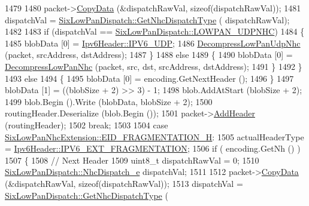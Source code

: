 \begin{DoxyCode}
1479 
1480           packet->\hyperlink{classns3_1_1Packet_a5a6d304b9e0d90733919ffe224b98f0d}{CopyData} (&dispatchRawVal, \textcolor{keyword}{sizeof}(dispatchRawVal));
1481           dispatchVal = \hyperlink{classns3_1_1SixLowPanDispatch_aadc1e9ded2e292f557da546a6a4e49d2}{SixLowPanDispatch::GetNhcDispatchType} (
      dispatchRawVal);
1482 
1483           \textcolor{keywordflow}{if} (dispatchVal == \hyperlink{classns3_1_1SixLowPanDispatch_acbf93399dca3b5424dcc76de45a57f5faf1d4da6a831d704993ea3946327c8c0c}{SixLowPanDispatch::LOWPAN\_UDPNHC})
1484             \{
1485               blobData [0] = \hyperlink{classns3_1_1Ipv6Header_a226429221a066c5e3b1f260caf27d1e9aef42146d6b211521c22f827b04530253}{Ipv6Header::IPV6\_UDP};
1486               \hyperlink{classns3_1_1SixLowPanNetDevice_a0b31fbe0bdc3a4dd59b9f7426aec8ed8}{DecompressLowPanUdpNhc} (packet, srcAddress, dstAddress);
1487             \}
1488           \textcolor{keywordflow}{else}
1489             \{
1490               blobData [0] = \hyperlink{classns3_1_1SixLowPanNetDevice_af69701425fa2e02ab4a7fdcd1db99cc8}{DecompressLowPanNhc} (packet, src, dst, srcAddress, 
      dstAddress);
1491             \}
1492         \}
1493       \textcolor{keywordflow}{else}
1494         \{
1495           blobData [0] = encoding.GetNextHeader ();
1496         \}
1497       blobData [1] = ((blobSize + 2) >> 3) - 1;
1498       blob.AddAtStart (blobSize + 2);
1499       blob.Begin ().Write (blobData, blobSize + 2);
1500       routingHeader.Deserialize (blob.Begin ());
1501       packet->\hyperlink{classns3_1_1Packet_a465108c595a0bc592095cbcab1832ed8}{AddHeader} (routingHeader);
1502       \textcolor{keywordflow}{break};
1503 
1504     \textcolor{keywordflow}{case} \hyperlink{classns3_1_1SixLowPanNhcExtension_ac692a22abe80c30bcbafa57ef36bf5ada62051012ae9fe03967626d4c451f39fd}{SixLowPanNhcExtension::EID\_FRAGMENTATION\_H}:
1505       actualHeaderType = \hyperlink{classns3_1_1Ipv6Header_a226429221a066c5e3b1f260caf27d1e9a5839daf3fdfb16dfdc94a208ca6ebc5a}{Ipv6Header::IPV6\_EXT\_FRAGMENTATION};
1506       \textcolor{keywordflow}{if} ( encoding.GetNh () )
1507         \{
1508           \textcolor{comment}{// Next Header}
1509           uint8\_t dispatchRawVal = 0;
1510           \hyperlink{classns3_1_1SixLowPanDispatch_acbf93399dca3b5424dcc76de45a57f5f}{SixLowPanDispatch::NhcDispatch\_e} dispatchVal;
1511 
1512           packet->\hyperlink{classns3_1_1Packet_a5a6d304b9e0d90733919ffe224b98f0d}{CopyData} (&dispatchRawVal, \textcolor{keyword}{sizeof}(dispatchRawVal));
1513           dispatchVal = \hyperlink{classns3_1_1SixLowPanDispatch_aadc1e9ded2e292f557da546a6a4e49d2}{SixLowPanDispatch::GetNhcDispatchType} (

\end{DoxyCode}
